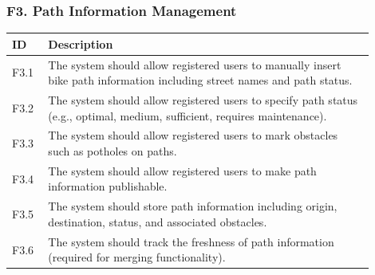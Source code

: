 \subsubsection{F3. Path Information Management}
\begin{center}
    \begin{longtable}{ |l|p{0.9\linewidth}| }
        \hline
        \textbf{ID} & \textbf{Description} \\
        \hline
        F3.1 & The system should allow registered users to manually insert bike path information including street names and path status. \\
        \hline
        F3.2 & The system should allow registered users to specify path status (e.g., optimal, medium, sufficient, requires maintenance). \\
        \hline
        F3.3 & The system should allow registered users to mark obstacles such as potholes on paths. \\
        \hline
        F3.4 & The system should allow registered users to make path information publishable. \\
        \hline
        F3.5 & The system should store path information including origin, destination, status, and associated obstacles. \\
        \hline
        F3.6 & The system should track the freshness of path information (required for merging functionality). \\
        \hline
    \end{longtable}
\end{center}

